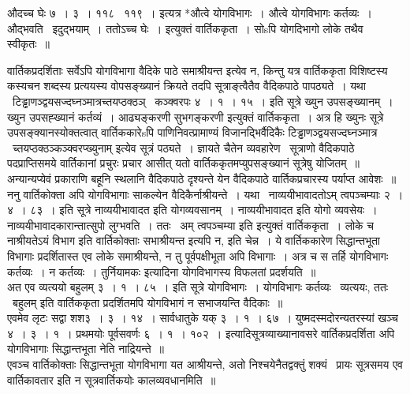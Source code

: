 \documentclass[11pt, openany]{book}
\begin{document}
औदच्च घेः ७~। ३~। ११८ \textendash\ ११९~। इत्यत्र *औत्वे योगविभागः~। औत्वे योगविभागः कर्तव्यः~। औद्भवति \textendash\ इदुद्भयाम्~। ततोऽच्च घेः~। इत्युक्तं वार्तिककृता~। सोsपि योगदिभागो लोके तथैव स्वीकृतः~॥

वार्तिकप्रदर्शिताः सर्वेऽपि योगविभागा वैदिके पाठे समाश्रीयन्त इत्येव न, किन्तु यत्र वार्तिककृता विशिष्टस्य कस्यचन शब्दस्य प्रत्ययस्य वोपसङ्ख्यानं क्रियते तदपि सूत्राङ्त्वैतैव वैदिकपाठे पापठ्यते~। यथा \textendash\ टिड्ढाणञ्द्वयसज्दघ्नञ्मात्रच्तयप्ठक्ठञ् \textendash\ कञ्क्वरपः ४~। १~। १५~। इति सूत्रे {\qt *ख्युन उपसङ्ख्यानम्~। ख्युन उपसह्ख्यानं कर्तव्यं~। आढ्यङ्करणी सुभगङ्करणी} इत्युक्तं वार्तिककृता~। अत्र हि ख्युनः सूत्रे उपसङ्क्यानस्योक्तत्वात् वार्तिककारेsपि पाणिनिवत्प्रामाण्यं विजानद्भिर्वैदिकैः {\qt टिड्ढाणञ्द्वयसज्दघ्नञ्मात्र \textendash\ च्तयप्ठक्ठञ्कञ्क्वरप्ख्युनाम्} इत्येव सूत्रं पठ्यते~। ज्ञायते चैतेन व्यवहारेण \textendash\ {\qt सूत्राणो वैदिकपाठे पदप्राप्तिसमये वार्तिकानां प्रचुरः प्रचार आसीत्} यतो वार्तिककृतमप्युपसङ्ख्यानं सूत्रेषु योजितम्~॥ अन्यान्यप्येवं प्रकाराणि बहूनि स्थलानि वैदिकपाठे दृश्यन्ते येन वैदिकपाठे वार्तिकप्रचारस्य पर्याप्त आवेशः~॥\\

ननु वार्तिकोक्ता अपि योगविभागाः साकल्येन वैदिकैर्नाश्रीयन्ते~। यथा \textendash\ नाव्ययीभावादतोऽम् त्वपञ्चम्याः २~। ४~। ८३~। इति सूत्रे {\qt नाव्ययीभावादत इति योगव्यवसानम्~। नाव्ययीभावादत इति योगो व्यवसेयः~। नाव्ययीभावादकारान्तात्सुपो लुग्भवति~। ततः \textendash\ अम् त्वपञ्चम्या इति} इत्युक्तं वार्तिककृता~। लोके च नाश्रीयतेऽयं विभाग इति वार्तिकोक्ताः सभाश्रीयन्त इत्यपि न, इति चेन्न~। ये वार्तिककारेण सिद्धान्तभूता विभागाः प्रदर्शितास्त एव लोके समाश्रीयन्ते, न तु पूर्वपक्षीभूता अपि विभागाः~। अत्र च {\qt स तर्हि योगविभागः कर्तव्यः~। न कर्तव्यः~। तुर्नियामकः} इत्यादिना योगविभागस्य विफलतां प्रदर्शयति~॥\\

अत एव व्यत्ययो बहुलम् ३~। १~। ८५~। इति सूत्रे {\qt *योगविभागः~। योगविभागः कर्तव्यः \textendash\ व्यत्ययः, ततः \textendash\ बहुलम्} इति वार्तिककृता प्रदर्शितमपि योगविभागं न सभाजयन्ति वैदिकाः~॥\\

एवमेव लृटः सद्वा शश३~। ३~। १४~। सार्वधातुके यक् ३~। १~। ६७~। युष्मदस्मदोरन्यतरस्यां खञ्च ४~। ३~। १~। प्रथमयोः पूर्वसवर्णः ६~। १~। १०२~। इत्यादिसूत्रव्याख्यानावसरे वार्तिकप्रदर्शिता अपि योगविभागाः सिद्धान्तभूता नेति नाद्रियन्ते~॥\\

एवञ्च वार्तिकोक्ताः सिद्धान्तभूता योगविभागा यत आश्रीयन्ते, अतो निश्चयेनैतद्वक्तुं शक्यं \textendash\ प्रायः सूत्रसमय एव वार्तिकावतार इति न सूत्रवार्तिकयोः कालव्यवधानमिति~॥\\
\end{document}
